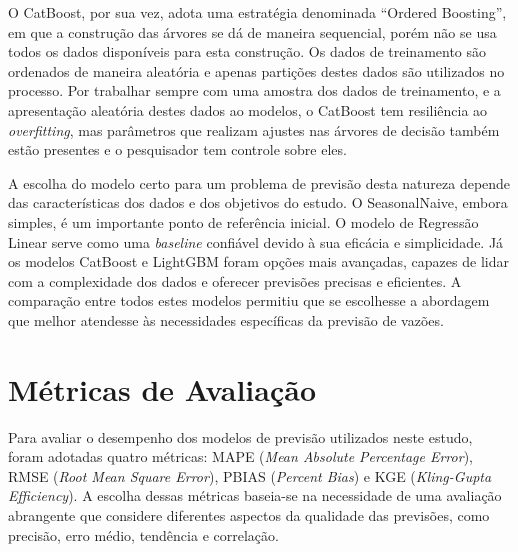 O CatBoost, por sua vez, adota uma estratégia denominada ``Ordered Boosting'', em que a construção das árvores se dá de maneira sequencial, porém não se usa todos os dados disponíveis para esta construção. Os dados de treinamento são ordenados de maneira aleatória e apenas partições destes dados são utilizados no processo. Por trabalhar sempre com uma amostra dos dados de treinamento, e a apresentação aleatória destes dados ao modelos, o CatBoost tem resiliência ao \textit{overfitting}, mas parâmetros que realizam ajustes nas árvores de decisão também estão presentes e o pesquisador tem controle sobre eles.\cite{catboost_docs}\cite{dorogush2018catboost}\cite{prokhorenkova2018catboost}


A escolha do modelo certo para um problema de previsão desta natureza depende das características dos dados e dos objetivos do estudo. O SeasonalNaive, embora simples, é um importante ponto de referência inicial. O modelo de Regressão Linear serve como uma \textit{baseline} confiável devido à sua eficácia e simplicidade. Já os modelos CatBoost e LightGBM foram opções mais avançadas, capazes de lidar com a complexidade dos dados e oferecer previsões precisas e eficientes. A comparação entre todos estes modelos permitiu que se escolhesse a abordagem que melhor atendesse às necessidades específicas da previsão de vazões.

\section{Métricas de Avaliação}

Para avaliar o desempenho dos modelos de previsão utilizados neste estudo, foram adotadas quatro métricas: MAPE (\textit{Mean Absolute Percentage Error}), RMSE (\textit{Root Mean Square Error}), PBIAS (\textit{Percent Bias}) e KGE (\textit{Kling-Gupta Efficiency}). A escolha dessas métricas baseia-se na necessidade de uma avaliação abrangente que considere diferentes aspectos da qualidade das previsões, como precisão, erro médio, tendência e correlação.

